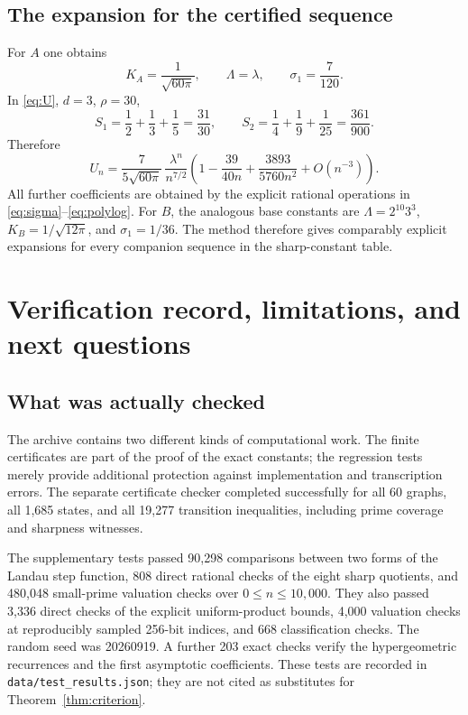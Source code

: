 \documentclass[11pt]{article}
\theoremstyle{definition}
\theoremstyle{remark}
\begin{document}
\subsection{The expansion for the certified sequence}
For $A$ one obtains
\[
 K_A=\frac1{\sqrt{60\pi}},\qquad \Lambda=\lambda,
 \qquad \sigma_1=\frac7{120}.
\]
In \eqref{eq:U}, $d=3$, $\rho=30$,
\[
 S_1=\frac12+\frac13+\frac15=\frac{31}{30},\qquad
 S_2=\frac14+\frac19+\frac1{25}=\frac{361}{900}.
\]
Therefore
\begin{equation}\label{eq:Uasym}
 \boxed{\displaystyle
 U_n=\frac{7}{5\sqrt{60\pi}}\,
       \frac{\lambda^n}{n^{7/2}}
       \left(1-\frac{39}{40n}+\frac{3893}{5760n^2}
       +O(n^{-3})\right).}
\end{equation}
All further coefficients are obtained by the explicit rational
operations in \eqref{eq:sigma}--\eqref{eq:polylog}. For $B$, the analogous
base constants are $\Lambda=2^{10}3^3$, $K_B=1/\sqrt{12\pi}$,
and $\sigma_1=1/36$. The method therefore gives comparably explicit
expansions for every companion sequence in the sharp-constant table.

\section{Verification record, limitations, and next questions}
\subsection{What was actually checked}
The archive contains two different kinds of computational work.
The finite certificates are part of the proof of the exact constants;
the regression tests merely provide additional protection against
implementation and transcription errors. The separate certificate
checker completed successfully for all 60 graphs, all 1,685 states,
and all 19,277 transition inequalities, including prime coverage and
sharpness witnesses.

The supplementary tests passed 90,298 comparisons between two forms
of the Landau step function, 808 direct rational checks of the eight
sharp quotients, and 480,048 small-prime valuation checks over
$0\leq n\leq10,000$. They also passed 3,336 direct checks of the
explicit uniform-product bounds, 4,000 valuation checks at reproducibly
sampled 256-bit indices, and 668 classification checks. The random
seed was 20260919. A further 203 exact checks verify the hypergeometric
recurrences and the first asymptotic coefficients. These tests are recorded in
\texttt{data/test\_results.json}; they are not cited as substitutes for
Theorem~\ref{thm:criterion}.
\end{document}
